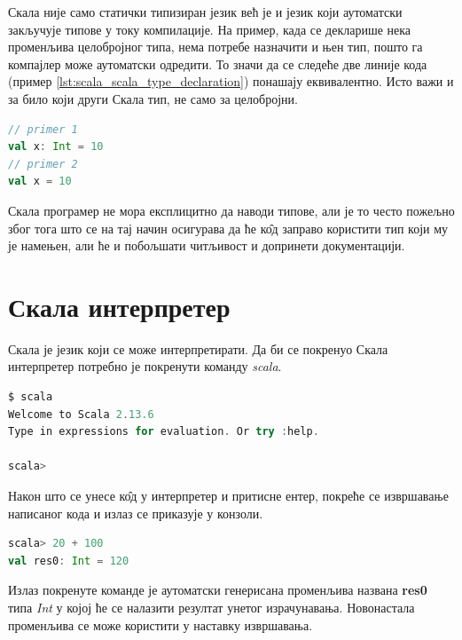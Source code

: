 \documentclass[12pt,oneside]{memoir}
\begin{document}
Скала није само статички типизиран језик већ је и језик који аутоматски закључује типове у току компилације. На пример, када се декларише нека променљива целобројног типа, нема потребе назначити и њен тип, пошто га компајлер може аутоматски одредити. То значи да се следеће две линије кода (пример \ref{lst:scala_scala_type_declaration}) понашају еквивалентно. Исто важи и за било који други Скала тип, не само за целобројни.

\begin{lstlisting}[caption={Декларација променљиве без и са аутоматским закључивањем типова}, language=Scala, label={lst:scala_scala_type_declaration}]
// primer 1
val x: Int = 10
// primer 2
val x = 10
\end{lstlisting}

Скала програмер не мора експлицитно да наводи типове, али је то  често пожељно због тога што се на тај начин осигурава да ће к\^{о}д заправо користити тип који му је намењен, али ће и побољшати читљивост и допринети документацији.

\section{Скала интерпретер}
\label{sec:scala_interpr}

Скала је језик који се може интерпретирати. Да би се покренуо Скала интерпретер потребно је покренути команду \textit{scala}.

\begin{lstlisting}[language=Scala, caption={Скала интерпретер}, label={lst:scala_scala_interpreter_example}]
$ scala
Welcome to Scala 2.13.6
Type in expressions for evaluation. Or try :help.

scala>
\end{lstlisting}

Након што се унесе к\^{о}д у интерпретер и притисне ентер, покреће се извршавање написаног кода и излаз се приказује у конзоли.

\begin{lstlisting}[language=Scala, caption={Пример извршавања кода у интерпретеру}, label={lst:scala_interpreter_code_example}]
scala> 20 + 100
val res0: Int = 120
\end{lstlisting}

Излаз покренуте команде је аутоматски генерисана променљива названа \textbf{res0} типа \textit{Int} у којој ће се налазити резултат унетог израчунавања. Новонастала променљива се може користити у наставку извршавања.
\end{document}
